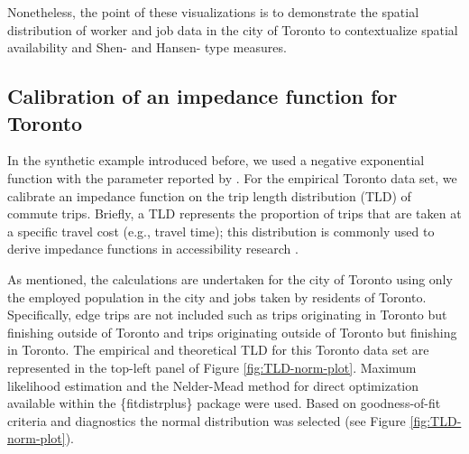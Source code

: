\documentclass[]{elsarticle} %
\begin{document}
Nonetheless, the point of these visualizations is to demonstrate the
spatial distribution of worker and job data in the city of Toronto to
contextualize spatial availability and Shen- and Hansen- type measures.

\hypertarget{calibration-of-an-impedance-function-for-toronto}{%
\subsection{Calibration of an impedance function for
Toronto}\label{calibration-of-an-impedance-function-for-toronto}}

In the synthetic example introduced before, we used a negative
exponential function with the parameter reported by \citet{shen1998}.
For the empirical Toronto data set, we calibrate an impedance function
on the trip length distribution (TLD) of commute trips. Briefly, a TLD
represents the proportion of trips that are taken at a specific travel
cost (e.g., travel time); this distribution is commonly used to derive
impedance functions in accessibility research
\citep{lopez_2017_spatial, horbachov_theoretical_2018, batista_estimation_2019}.

As mentioned, the calculations are undertaken for the city of Toronto
using only the employed population in the city and jobs taken by
residents of Toronto. Specifically, edge trips are not included such as
trips originating in Toronto but finishing outside of Toronto and trips
originating outside of Toronto but finishing in Toronto. The empirical
and theoretical TLD for this Toronto data set are represented in the
top-left panel of Figure \ref{fig:TLD-norm-plot}. Maximum likelihood
estimation and the Nelder-Mead method for direct optimization available
within the \{fitdistrplus\} package \citep{fitdistrplus_2015} were used.
Based on goodness-of-fit criteria and diagnostics the normal
distribution was selected (see Figure \ref{fig:TLD-norm-plot}).
\end{document}
